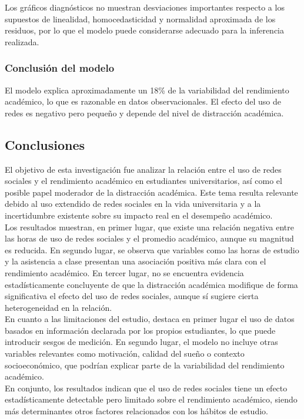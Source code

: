\documentclass[12pt]{article}
\begin{document}
Los gráficos diagnósticos no muestran desviaciones importantes respecto a los supuestos de linealidad, homocedasticidad y normalidad aproximada de los residuos, por lo que el modelo puede considerarse adecuado para la inferencia realizada.
\subsubsection*{Conclusión del modelo}

El modelo explica aproximadamente un 18\% de la variabilidad del rendimiento académico, lo que es razonable en datos observacionales. El efecto del uso de redes es negativo pero pequeño y depende del nivel de distracción académica.


\subsection*{Conclusiones}

El objetivo de esta investigación fue analizar la relación entre el uso de redes sociales y el rendimiento académico en estudiantes universitarios, así como el posible papel moderador de la distracción académica. Este tema resulta relevante debido al uso extendido de redes sociales en la vida universitaria y a la incertidumbre existente sobre su impacto real en el desempeño académico.\\

Los resultados muestran, en primer lugar, que existe una relación negativa entre las horas de uso de redes sociales y el promedio académico, aunque su magnitud es reducida. En segundo lugar, se observa que variables como las horas de estudio y la asistencia a clase presentan una asociación positiva más clara con el rendimiento académico. En tercer lugar, no se encuentra evidencia estadísticamente concluyente de que la distracción académica modifique de forma significativa el efecto del uso de redes sociales, aunque sí sugiere cierta heterogeneidad en la relación.\\

En cuanto a las limitaciones del estudio, destaca en primer lugar el uso de datos basados en información declarada por los propios estudiantes, lo que puede introducir sesgos de medición. En segundo lugar, el modelo no incluye otras variables relevantes como motivación, calidad del sueño o contexto socioeconómico, que podrían explicar parte de la variabilidad del rendimiento académico.\\

En conjunto, los resultados indican que el uso de redes sociales tiene un efecto estadísticamente detectable pero limitado sobre el rendimiento académico, siendo más determinantes otros factores relacionados con los hábitos de estudio.\\
\end{document}
